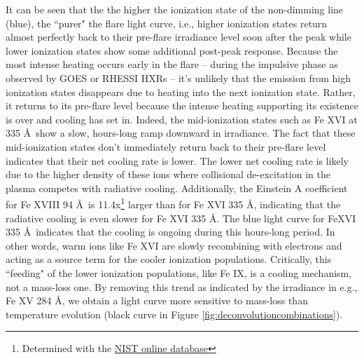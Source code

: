 It can be seen that the the higher the ionization state of the non-dimming line (blue), the ``purer" the flare light curve, i.e., higher ionization states return almost perfectly back to their pre-flare irradiance level soon after the peak while lower ionization states show some additional post-peak response. Because the most intense heating occurs early in the flare -- during the impulsive phase as observed by GOES or RHESSI HXRs -- it's unlikely that the emission from high ionization states disappears due to heating into the next ionization state. Rather, it returns to its pre-flare level because the intense heating supporting its existence is over and cooling has set in. Indeed, the mid-ionization states such as Fe XVI at 335 \AA\ show a slow, hours-long ramp downward in irradiance. The fact that these mid-ionization states don't immediately return back to their pre-flare level indicates that their net cooling rate is lower. The lower net cooling rate is likely due to the higher density of these ions where collisional de-excitation in the plasma competes with radiative cooling. Additionally, the Einstein A coefficient for Fe XVIII 94 \AA\ is 11.4x\footnote{Determined with the \href{http://physics.nist.gov/PhysRefData/ASD/lines_form.html}{NIST online database}} larger than for Fe XVI 335 \AA, indicating that the radiative cooling is even slower for Fe XVI 335 \AA. The blue light curve for FeXVI 335 \AA\ indicates that the cooling is ongoing during this hours-long period. In other words, warm ions like Fe XVI are slowly recombining with electrons and acting as a source term for the cooler ionization populations. Critically, this ``feeding" of the lower ionization populations, like Fe IX, is a cooling mechanism, not a mass-loss one. By removing this trend as indicated by the irradiance in e.g., Fe XV 284 \AA, we obtain a light curve more sensitive to mass-loss than temperature evolution (black curve in Figure \ref{fig:deconvolutioncombinations}). 

